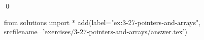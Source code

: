 
\begin{ex}
  \label{ex:3-27-pointers-and-arrays}
  
  \qed
\end{ex}
\begin{python0}
from solutions import *
add(label="ex:3-27-pointers-and-arrays",
    srcfilename='exercises/3-27-pointers-and-arrays/answer.tex')
\end{python0}

